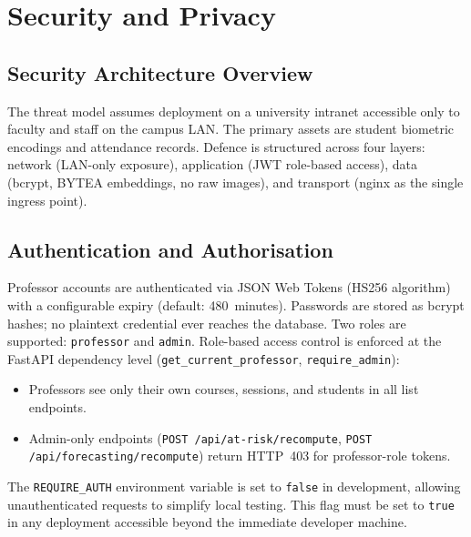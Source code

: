\section{Security and Privacy}
\label{sec:security}

\subsection{Security Architecture Overview}
\label{subsec:sec_overview}

The threat model assumes deployment on a university intranet accessible
only to faculty and staff on the campus LAN.  The primary assets are
student biometric encodings and attendance records.  Defence is
structured across four layers: network (LAN-only exposure), application
(JWT role-based access), data (bcrypt, BYTEA embeddings, no raw images),
and transport (nginx as the single ingress point).

\subsection{Authentication and Authorisation}
\label{subsec:auth}

Professor accounts are authenticated via JSON Web Tokens (HS256
algorithm) with a configurable expiry (default: 480~minutes).  Passwords
are stored as bcrypt hashes; no plaintext credential ever reaches the
database.  Two roles are supported: \texttt{professor} and
\texttt{admin}.  Role-based access control is enforced at the FastAPI
dependency level (\texttt{get\_current\_professor},
\texttt{require\_admin}):

\begin{itemize}
  \item Professors see only their own courses, sessions, and
    students in all list endpoints.
  \item Admin-only endpoints (\texttt{POST /api/at-risk/recompute},
    \texttt{POST /api/forecasting/recompute}) return HTTP~403 for
    professor-role tokens.
\end{itemize}

The \texttt{REQUIRE\_AUTH} environment variable is set to \texttt{false}
in development, allowing unauthenticated requests to simplify local
testing.  This flag must be set to \texttt{true} in any deployment
accessible beyond the immediate developer machine.

